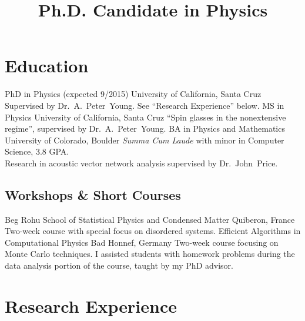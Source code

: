 \documentclass{cv}
\title{Ph.D. Candidate in Physics}
\def\Peter{Dr.~A.~Peter~Young}
\def\John{Dr.~John~Price}
\begin{document}
\maketitle

\section{Education}

\begin{cvjobs}
    {PhD in Physics \textnormal{(expected 9/2015)}}
    {University of California, Santa Cruz}
    {Supervised by \Peter. See ``Research Experience'' below.}
    {MS in Physics}
    {University of California, Santa Cruz}
    {``Spin glasses in the nonextensive regime'',
     supervised by \Peter.}
    {BA in Physics and Mathematics}
    {University of Colorado, Boulder}
    {\textit{Summa Cum Laude} with minor in Computer Science, 3.8 GPA. \\
     Research in acoustic vector network analysis supervised by \John.}
\end{cvjobs}

\subsection{Workshops \& Short Courses}

\begin{cvjobs}
    {Beg Rohu School of Statistical Physics and Condensed Matter}
    {Quiberon, France}
    {Two-week course with special focus on disordered systems.}
    {Efficient Algorithms in Computational Physics}
    {Bad Honnef, Germany}
    {Two-week course focusing on Monte Carlo techniques. I assisted students with
     homework problems during the data analysis portion of the course, taught by
     my PhD advisor.} 
\end{cvjobs}

\section{Research Experience}
\end{document}
